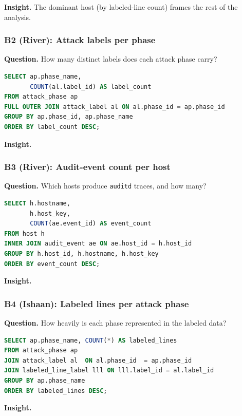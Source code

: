 \textbf{Insight.} %
The dominant host (by labeled-line count) frames the rest of the analysis.

\subsubsection{B2 (River): Attack labels per phase}
\textbf{Question.} How many distinct labels does each attack phase carry?
\begin{lstlisting}[language=SQL]
SELECT ap.phase_name,
       COUNT(al.label_id) AS label_count
FROM attack_phase ap
FULL OUTER JOIN attack_label al ON al.phase_id = ap.phase_id
GROUP BY ap.phase_id, ap.phase_name
ORDER BY label_count DESC;
\end{lstlisting}
\textbf{Insight.} %

\subsubsection{B3 (River): Audit-event count per host}
\textbf{Question.} Which hosts produce \texttt{auditd} traces, and how
many?

\begin{lstlisting}[language=SQL]
SELECT h.hostname,
       h.host_key,
       COUNT(ae.event_id) AS event_count
FROM host h
INNER JOIN audit_event ae ON ae.host_id = h.host_id
GROUP BY h.host_id, h.hostname, h.host_key
ORDER BY event_count DESC;
\end{lstlisting}
\textbf{Insight.} %

\subsubsection{B4 (Ishaan): Labeled lines per attack phase}
\textbf{Question.} How heavily is each phase represented in the labeled
data?
\begin{lstlisting}[language=SQL]
SELECT ap.phase_name, COUNT(*) AS labeled_lines
FROM attack_phase ap
JOIN attack_label al  ON al.phase_id  = ap.phase_id
JOIN labeled_line_label lll ON lll.label_id = al.label_id
GROUP BY ap.phase_name
ORDER BY labeled_lines DESC;
\end{lstlisting}
\textbf{Insight.} %

